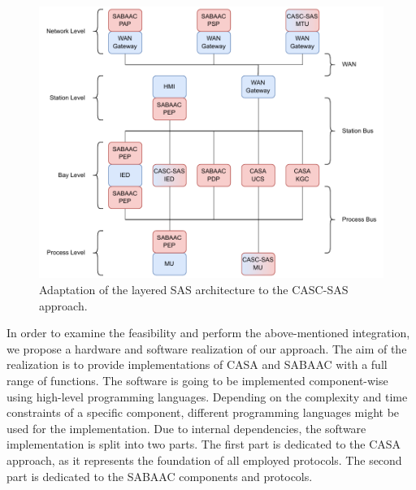 \begin{figure}
    \centering
    \includegraphics[width=1.0\linewidth]{figures/casc_architecture_color.drawio.pdf}
    \caption{Adaptation of the layered SAS architecture to the CASC-SAS approach.
    }
    \label{fig:casc_architecture}
\end{figure}

In order to examine the feasibility and perform the above-mentioned integration, we propose a hardware and software realization of our approach.
The aim of the realization is to provide implementations of CASA and SABAAC with a full range of functions.
The software is going to be implemented component-wise using high-level programming languages.
Depending on the complexity and time constraints of a specific component, different programming languages might be used for the implementation.
Due to internal dependencies, the software implementation is split into two parts.
The first part is dedicated to the CASA approach, as it represents the foundation of all employed protocols.
The second part is dedicated to the SABAAC components and protocols.

